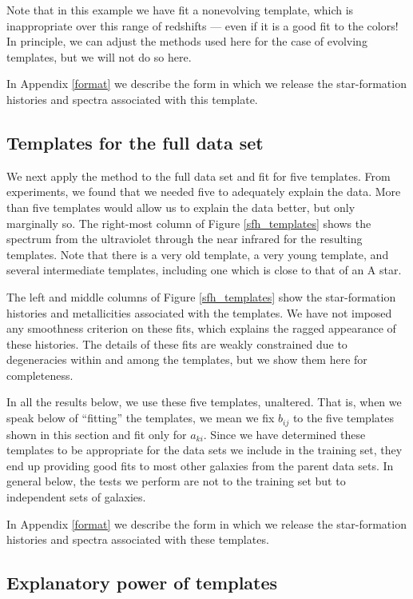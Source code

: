 \documentclass[10pt,preprint]{aastex}
\begin{document}
Note that in this example we have fit a nonevolving template, which is
inappropriate over this range of redshifts --- even if it is a good
fit to the colors! In principle, we can adjust the methods used here
for the case of evolving templates, but we will not do so here.

In Appendix \ref{format} we describe the form in which we release 
the star-formation histories and spectra associated with this
template.

\subsection{Templates for the full data set}

We next apply the method to the full data set and fit for five
templates. From experiments, we found that we needed five to
adequately explain the data. More than five templates would allow us
to explain the data better, but only marginally so.  The right-most
column of Figure \ref{sfh_templates} shows the spectrum from the
ultraviolet through the near infrared for the resulting
templates. Note that there is a very old template, a very young
template, and several intermediate templates, including one which is
close to that of an A star.

The left and middle columns of Figure \ref{sfh_templates} show the
star-formation histories and metallicities associated with the
templates. We have not imposed any smoothness criterion on these fits,
which explains the ragged appearance of these histories.  The details
of these fits are weakly constrained due to degeneracies within and
among the templates, but we show them here for completeness.

In all the results below, we use these five templates, unaltered. That
is, when we speak below of ``fitting'' the templates, we mean we fix
$b_{ij}$ to the five templates shown in this section and fit only for
$a_{ki}$. Since we have determined these templates to be appropriate
for the data sets we include in the training set, they end up
providing good fits to most other galaxies from the parent data sets.
In general below, the tests we perform are not to the training set but
to independent sets of galaxies.

In Appendix \ref{format} we describe the form in which we release the
star-formation histories and spectra associated with these templates.

\subsection{Explanatory power of templates}
\end{document}
